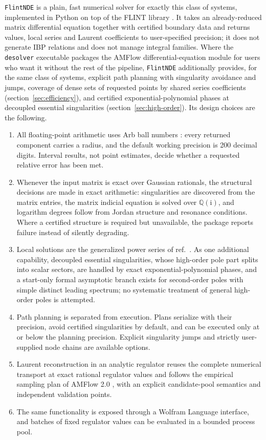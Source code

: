 \documentclass[11pt,a4paper]{article}
\newcommand{\ii}{\mathrm i}
\begin{document}
\texttt{FlintNDE} is a plain, fast numerical solver for exactly this class of systems,
implemented in Python on top of the FLINT library \cite{Johansson:2017arb,PythonFlint}. It
takes an already-reduced matrix differential equation together with certified boundary data
and returns values, local series and Laurent coefficients to user-specified precision; it
does not generate IBP relations and does not manage integral families. Where the
\texttt{desolver} executable packages the AMFlow differential-equation module for users who
want it without the rest of the pipeline, \texttt{FlintNDE} additionally provides, for the
same class of systems, explicit path planning with singularity avoidance and jumps, coverage
of dense sets of requested points by shared series coefficients
(section~\ref{sec:efficiency}), and certified exponential-polynomial phases at decoupled
essential singularities (section~\ref{sec:high-order}). Its design choices are the
following.
\begin{enumerate}
\item All floating-point arithmetic uses Arb ball numbers \cite{Johansson:2017arb}: every
returned component carries a radius, and the default working precision is 200 decimal
digits. Interval results, not point estimates, decide whether a requested relative error
has been met.
\item Whenever the input matrix is exact over Gaussian rationals, the structural decisions
are made in exact arithmetic: singularities are discovered from the matrix entries, the
matrix indicial equation is solved over $\mathbb Q(\ii)$, and logarithm degrees follow from
Jordan structure and resonance conditions. Where a
 certified structure is required but unavailable, the package reports failure instead of
 silently degrading.
\item Local solutions are the generalized power series of ref.~\cite{Moriello:2019yhu}.
As one additional capability, decoupled essential singularities, whose high-order pole
part splits into scalar sectors, are handled by exact exponential-polynomial phases, and a
start-only formal asymptotic branch exists for second-order poles with simple distinct
leading spectrum; no systematic treatment of general high-order poles is attempted.
\item Path planning is separated from execution. Plans serialize with their precision, avoid
certified singularities by default, and can be executed only at or below the planning
precision. Explicit singularity jumps and strictly user-supplied node chains are available
options.
\item Laurent reconstruction in an analytic regulator reuses the complete numerical
transport at exact rational regulator values and follows the empirical sampling plan of
AMFlow 2.0 \cite{Huang:2026rjb}, with an explicit candidate-pool semantics and independent
validation points.
\item The same functionality is exposed through a Wolfram Language interface, and batches
of fixed regulator values can be evaluated in a bounded process pool.
\end{enumerate}
\end{document}
